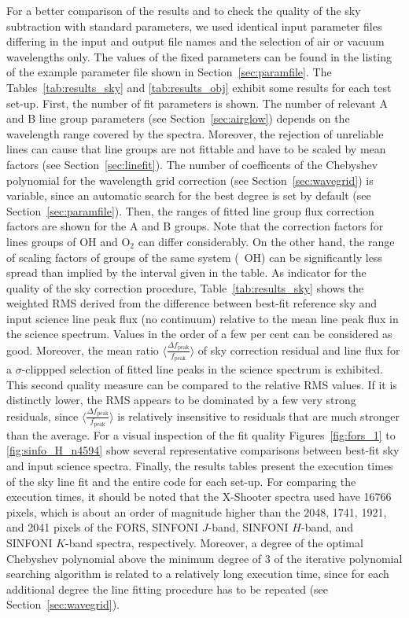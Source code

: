 For a better comparison of the results and to check the quality of the sky
subtraction with standard parameters, we used identical input parameter files
differing in the input and output file names and the selection of air or
vacuum wavelengths only. The values of the fixed parameters can be found in the
listing of the example parameter file shown in Section~\ref{sec:paramfile}.
The Tables~\ref{tab:results_sky} and \ref{tab:results_obj} exhibit some results
for each test set-up. First, the number of fit parameters is shown. The number
of relevant A and B line group parameters (see Section~\ref{sec:airglow})
depends on the wavelength range covered by the spectra. Moreover, the rejection
of unreliable lines can cause that line groups are not fittable and have to be
scaled by mean factors (see Section~\ref{sec:linefit}). The number of
coefficents of the Chebyshev polynomial for the wavelength grid correction (see
Section~\ref{sec:wavegrid}) is variable, since an automatic search for the best
degree is set by default (see Section~\ref{sec:paramfile}). Then, the ranges of
fitted line group flux correction factors are shown for the A and B groups.
Note that the correction factors for lines groups of OH and O$_2$ can differ
considerably. On the other hand, the range of scaling factors of groups of the
same system (\eg\ OH) can be significantly less spread than implied by the
interval given in the table. As indicator for the quality of the sky correction
procedure, Table~\ref{tab:results_sky} shows the weighted RMS derived from
the difference between best-fit reference sky and input science line peak flux
(no continuum) relative to the mean line peak flux in the science spectrum.
Values in the order of a few per cent can be considered as good. Moreover, the
mean ratio $\langle \frac{\Delta f_\mathrm{peak}}{f_\mathrm{peak}} \rangle$ of sky
correction residual and line flux for a $\sigma$-clippped selection of fitted
line peaks in the science spectrum is exhibited. This second quality measure
can be compared to the relative RMS values. If it is distinctly lower, the
RMS appears to be dominated by a few very strong residuals, since
$\langle \frac{\Delta f_\mathrm{peak}}{f_\mathrm{peak}} \rangle$ is relatively
insensitive to residuals that are much stronger than the average. For a visual
inspection of the fit quality Figures~\ref{fig:fors_1} to
\ref{fig:sinfo_H_n4594} show several representative comparisons between
best-fit sky and input science spectra. Finally, the results tables present the
execution times of the sky line fit and the entire code for each set-up. For
comparing the execution times, it should be noted that the X-Shooter spectra
used have 16766 pixels, which is about an order of magnitude higher than the
2048, 1741, 1921, and 2041 pixels of the FORS, SINFONI $J$-band, SINFONI
$H$-band, and SINFONI $K$-band spectra, respectively. Moreover, a degree of the
optimal Chebyshev polynomial above the minimum degree of 3 of the iterative
polynomial searching algorithm is related to a relatively long execution time,
since for each additional degree the line fitting procedure has to be repeated
(see Section~\ref{sec:wavegrid}).

